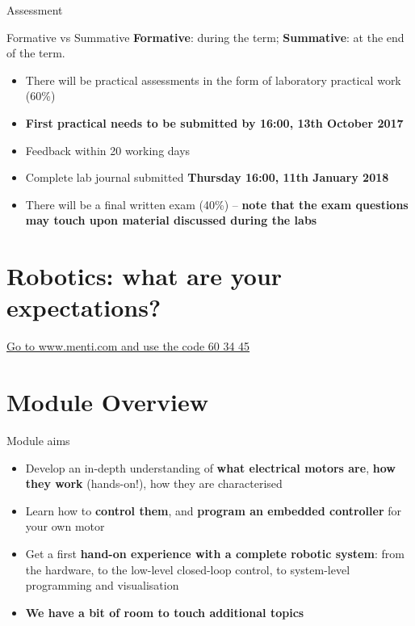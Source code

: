 \documentclass[compress]{beamer}
\begin{document}
\begin{frame}{Assessment}
    \begin{exampleblock}{Formative vs Summative}
        \textbf{Formative}: during the term; \textbf{Summative}: at the end of
        the term.
    \end{exampleblock}

    \begin{itemize}
        \item There will be practical assessments in the form of laboratory
            practical work (60\%)
        \item \textbf{First practical needs to be submitted by 16:00, 13th October 2017}
        \item Feedback within 20 working days
        \item Complete lab journal submitted \textbf{Thursday 16:00, 11th January 2018}
        \item There will be a final written exam (40\%) -- \textbf{note that the
            exam questions may touch upon material discussed during the labs}
    \end{itemize}

\end{frame}


\section[]{Robotics: what are your expectations?}

\begin{frame}[plain]
    \begin{center}
        \Large
    \href{https://www.mentimeter.com/s/d42456cc370aa465642c7e815a68646b/4fdc61757b92}{Go to www.menti.com and use the code 60 34 45}
    \end{center}
\end{frame}


\section[Overview]{Module Overview}



\begin{frame}{Module aims}
    \begin{itemize}
        \item<+-> Develop an in-depth understanding of \textbf{what electrical motors are},
            \textbf{how they work} (hands-on!), how they are characterised
        \item<+-> Learn how to \textbf{control them}, and \textbf{program an embedded controller}
            for your own motor
        \item<+-> Get a first \textbf{hand-on experience with a complete robotic system}:
            from the hardware, to the low-level closed-loop control, to
            system-level programming and visualisation
        \item<+-> \textbf{We have a bit of room to touch additional topics}
    \end{itemize}
\end{frame}
\end{document}
